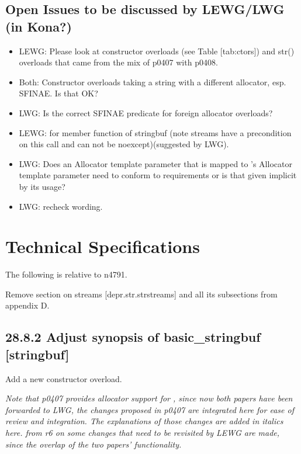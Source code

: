 \documentclass[ebook,11pt,article]{memoir}
\renewcommand{\ref}[1]{[#1]}
\begin{document}
\section{Open Issues to be discussed by LEWG/LWG (in Kona?)}
\begin{itemize}
\item LEWG: Please look at constructor overloads (see Table \ref{tab:ctors}) and str() overloads that came from the mix of p0407 with p0408.
\item Both: Constructor overloads taking a string with a different allocator, esp. SFINAE. Is that OK?
\item LWG: Is  the correct SFINAE predicate for foreign allocator overloads?
\item LEWG:  for  member function of stringbuf (note streams have a precondition on this call and can not be noexcept)(suggested by LWG).
\item LWG: Does an Allocator template parameter that is mapped to 's Allocator template parameter need to conform to  requirements or is that given implicit by its usage?
\item LWG: recheck wording.
\end{itemize}


\chapter{Technical Specifications}
The following is relative to n4791.

Remove section on  streams [depr.str.strstreams] and all its subsections from appendix D.

\section{28.8.2 Adjust synopsis of basic\_stringbuf [stringbuf]}
Add a new constructor overload.

\textit{Note that p0407 provides allocator support for , since now both papers have been forwarded to LWG, the changes proposed in p0407 are integrated here for ease of review and integration. The explanations of those changes are added in italics here. from r6 on some changes that need to be revisited by LEWG are made, since the overlap of the two papers' functionality.}
\end{document}
